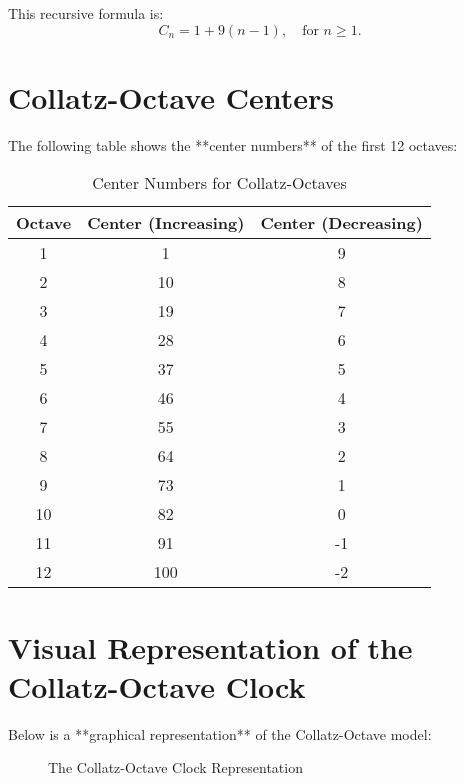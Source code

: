 \documentclass[a4paper,12pt]{article}
\begin{document}
This recursive formula is:
\begin{equation}
C_n = 1 + 9(n - 1), \quad \text{for } n \geq 1.
\end{equation}

\section{Collatz-Octave Centers}
The following table shows the **center numbers** of the first 12 octaves:

\begin{table}[h]
    \centering
    \caption{Center Numbers for Collatz-Octaves}
    \begin{tabular}{ccc}
        \toprule
        Octave & Center (Increasing) & Center (Decreasing) \\
        \midrule
        1  & 1   & 9   \\
        2  & 10  & 8   \\
        3  & 19  & 7   \\
        4  & 28  & 6   \\
        5  & 37  & 5   \\
        6  & 46  & 4   \\
        7  & 55  & 3   \\
        8  & 64  & 2   \\
        9  & 73  & 1   \\
        10 & 82  & 0   \\
        11 & 91  & -1  \\
        12 & 100 & -2  \\
        \bottomrule
    \end{tabular}
\end{table}

\section{Visual Representation of the Collatz-Octave Clock}
Below is a **graphical representation** of the Collatz-Octave model:

\begin{figure}[h]
    \centering
    \caption{The Collatz-Octave Clock Representation}
\end{figure}
\end{document}
